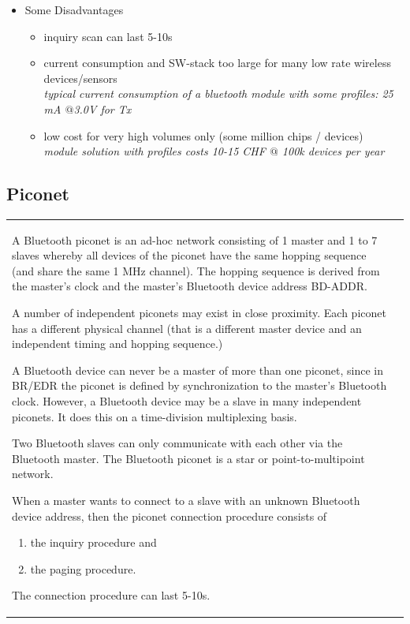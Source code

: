 \begin{itemize}
\begin{itemize}
	\end{itemize}
	\item Some Disadvantages
	\begin{itemize}
		\item inquiry scan can last 5-10s 
		\item current consumption and SW-stack too large for many low rate wireless devices/sensors \\
		\textit{typical current consumption of a bluetooth module with some profiles: 25 mA $@$3.0V for Tx}
		\item low cost for very high volumes only (some million chips / devices)  \\
		\textit{module solution with profiles costs 10-15 CHF $@$ 100k devices per year}
	\end{itemize}
\end{itemize}

\subsection{Piconet}
	\begin{tabular}{ll}
		\parbox{14cm}{
			A Bluetooth piconet is an ad-hoc network consisting of 1 master and 1 to 7 slaves 
			whereby all devices of the piconet have the same hopping sequence (and share the 
			same 1 MHz channel). The hopping sequence is derived from the master’s clock  
			and the master's Bluetooth device address BD-ADDR. 

			A number of independent piconets may exist in close proximity. Each piconet has a 
			different physical channel (that is a different master device and an independent timing 
			and hopping sequence.) 
			
			A Bluetooth device can never be a master of more than one piconet, since in BR/EDR the piconet
			is defined by synchronization to the master's Bluetooth clock. However, a Bluetooth device 
			may be a slave in many independent piconets. It does this on a time-division multiplexing basis.
			
			Two Bluetooth slaves can only communicate with each other via the Bluetooth master. The Bluetooth
			piconet is a star or point-to-multipoint network.
			
			When a master wants to connect to a slave with an unknown Bluetooth device address, then the piconet 
			connection procedure consists of
			\begin{enumerate}
				\item the inquiry procedure and
				\item the paging procedure.
			\end{enumerate}
			
			The connection procedure can last 5-10s.
		}	
		& \parbox{4cm}{
		}
	\end{tabular}

